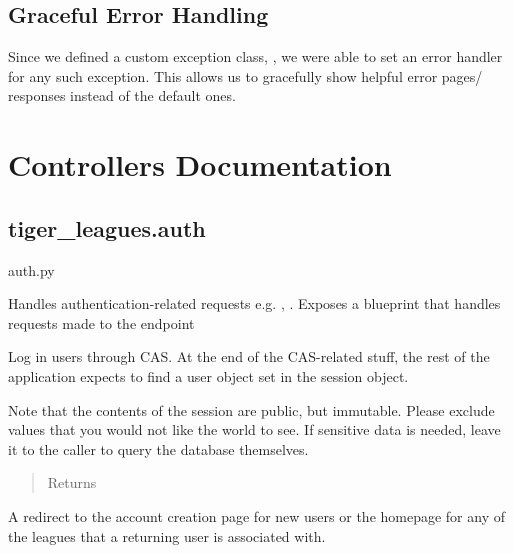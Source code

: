 \documentclass[letterpaper,10pt,english]{sphinxmanual}
\begin{document}
\subsection{Graceful Error Handling}
\label{\detokenize{tiger_leagues/readme:graceful-error-handling}}\label{\detokenize{tiger_leagues/readme:id2}}
Since we defined a custom exception class,
{\hyperref[\detokenize{tiger_leagues/models/readme:module-tiger_leagues.models.exception}]{}}, we were able to set an error handler
for any such exception. This allows us to gracefully show helpful error pages/
responses instead of the default ones.


\section{Controllers Documentation}
\label{\detokenize{tiger_leagues/readme:controllers-documentation}}\label{\detokenize{tiger_leagues/readme:id3}}

\subsection{tiger\_leagues.auth}
\label{\detokenize{tiger_leagues/readme:module-tiger_leagues.auth}}\label{\detokenize{tiger_leagues/readme:tiger-leagues-auth}}
auth.py

Handles authentication-related requests e.g. , .
Exposes a blueprint that handles requests made to the  endpoint

\begin{fulllineitems}
\label{\detokenize{tiger_leagues/readme:tiger_leagues.auth.cas_login}}
Log in users through CAS. At the end of the CAS-related stuff, the rest of 
the application expects to find a user object set in the session object.

Note that the contents of the session are public, but immutable. Please 
exclude values that you would not like the world to see. If sensitive data 
is needed, leave it to the caller to query the database themselves.
\begin{quote}\begin{description}
\item[{Returns}] \leavevmode
{}

\end{description}\end{quote}

A redirect to the account creation page for new users or the homepage for 
any of the leagues that a returning user is associated with.

\end{fulllineitems}
\end{document}
